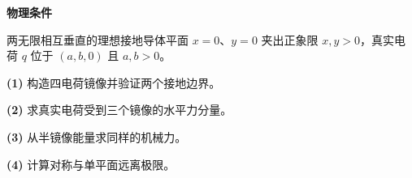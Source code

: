 \textbf{物理条件}\par 两无限相互垂直的理想接地导体平面 \(x=0\)、\(y=0\) 夹出正象限 \(x,y>0\)，真实电荷 \(q\) 位于 \((a,b,0)\) 且 \(a,b>0\)。
\par\noindent\textbf{(1)} 构造四电荷镜像并验证两个接地边界。
\par\noindent\textbf{(2)} 求真实电荷受到三个镜像的水平力分量。
\par\noindent\textbf{(3)} 从半镜像能量求同样的机械力。
\par\noindent\textbf{(4)} 计算对称与单平面远离极限。
